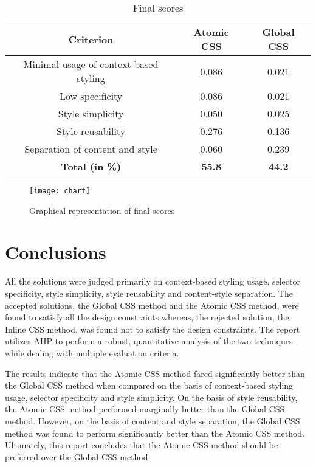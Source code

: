 \documentclass[12pt]{article}
\begin{document}
\begin{table}[h]
	\centering
	\begin{tabular}{|c|c|c|}
		\hline
		\textbf{Criterion} & \textbf{Atomic CSS} & \textbf{Global CSS} \\ 
		\hline
		Minimal usage of context-based styling & 0.086 & 0.021 \\
		\hline 
		Low specificity & 0.086 & 0.021 \\
		\hline
		Style simplicity & 0.050 & 0.025 \\
		\hline
		Style reusability & 0.276 & 0.136 \\
		\hline
		Separation of content and style & 0.060 & 0.239 \\
		\hline
		\textbf{Total (in \%)} & \textbf{55.8} & \textbf{44.2} \\
		\hline
	\end{tabular}
	\caption{Final scores}
\end{table}

\vspace{0.5cm}

\begin{figure}[h]
\texttt{[image: chart]}
\centering
\caption{Graphical representation of final scores}
\end{figure}

\vspace{0.5cm}

\newpage

\section{Conclusions}
All the solutions were judged primarily on context-based styling usage, selector specificity, style simplicity, style reusability and content-style separation. The accepted solutions, the Global CSS method and the Atomic CSS method, were found to satisfy all the design constraints whereas, the rejected solution, the Inline CSS method, was found not to satisfy the design constraints. The report utilizes AHP to perform a robust, quantitative analysis of the two techniques while dealing with multiple evaluation criteria.

The results indicate that the Atomic CSS method fared significantly better than the Global CSS method when compared on the basis of context-based styling usage, selector specificity and style simplicity. On the basis of style reusability, the Atomic CSS method performed marginally better than the Global CSS method. However, on the basis of content and style separation, the Global CSS method was found to perform significantly better than the Atomic CSS method. Ultimately, this report concludes that the Atomic CSS method should be preferred over the Global CSS method.
\end{document}
